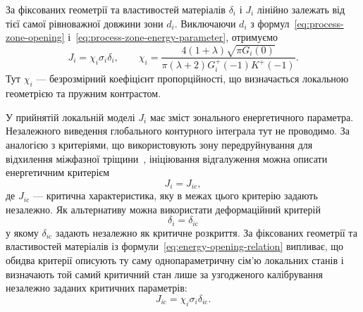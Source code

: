 За фіксованих геометрії та властивостей матеріалів $\delta_i$ і $J_i$ лінійно залежать від тієї самої рівноважної довжини зони $d_i$. Виключаючи $d_i$ з формул~\eqref{eq:process-zone-opening} і~\eqref{eq:process-zone-energy-parameter}, отримуємо
\begin{equation}
\label{eq:energy-opening-relation}
  J_i=\chi_i\sigma_i\delta_i,
  \qquad
  \chi_i=
  \frac{4(1+\lambda)\sqrt{\pi G_i(0)}}
  {\pi(\lambda+2)G_i^+(-1)K^+(-1)}.
\end{equation}
Тут $\chi_i$ — безрозмірний коефіцієнт пропорційності, що визначається локальною геометрією та пружним контрастом.

У прийнятій локальній моделі $J_i$ має зміст зонального енергетичного параметра. Незалежного виведення глобального контурного інтеграла тут не проводимо. За аналогією з критеріями, що використовують зону передруйнування для відхилення міжфазної тріщини~\citep{KaminskyEtAl2023}, ініціювання відгалуження можна описати енергетичним критерієм
\begin{equation*}
  J_i=J_{i\mathrm{c}},
\end{equation*}
де $J_{i\mathrm{c}}$ — критична характеристика, яку в межах цього критерію задають незалежно. Як альтернативу можна використати деформаційний критерій
\begin{equation*}
  \delta_i=\delta_{i\mathrm{c}}
\end{equation*}
у якому $\delta_{i\mathrm{c}}$ задають незалежно як критичне розкриття. За фіксованих геометрії та властивостей матеріалів із формули~\eqref{eq:energy-opening-relation} випливає, що обидва критерії описують ту саму однопараметричну сім’ю локальних станів і визначають той самий критичний стан лише за узгодженого калібрування незалежно заданих критичних параметрів:
\begin{equation*}
  J_{i\mathrm{c}}
  =\chi_i\sigma_i\delta_{i\mathrm{c}}.
\end{equation*}
